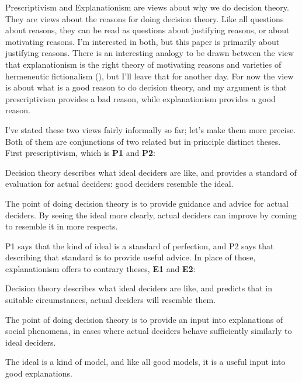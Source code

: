 \documentclass[
  11pt,
  letterpaper,
  DIV=11,
  numbers=noendperiod,
  twoside]{scrartcl}
\providecommand{\tightlist}{%
  \setlength{\itemsep}{0pt}\setlength{\parskip}{0pt}}\usepackage{longtable,booktabs,array}
\begin{document}
Prescriptivism and Explanationism are views about why we do decision
theory. They are views about the reasons for doing decision theory. Like
all questions about reasons, they can be read as questions about
justifying reasons, or about motivating reasons. I'm interested in both,
but this paper is primarily about justifying reasons. There is an
interesting analogy to be drawn between the view that explanationism is
the right theory of motivating reasons and varieties of hermeneutic
fictionalism (),
but I'll leave that for another day. For now the view is about what is a
good reason to do decision theory, and my argument is that
prescriptivism provides a bad reason, while explanationism provides a
good reason.

I've stated these two views fairly informally so far; let's make them
more precise. Both of them are conjunctions of two related but in
principle distinct theses. First prescriptivism, which is \textbf{P1}
and \textbf{P2}:

\begin{description}
\tightlist
\item[P1]
Decision theory describes what ideal deciders are like, and provides a
standard of evaluation for actual deciders: good deciders resemble the
ideal.
\item[P2]
The point of doing decision theory is to provide guidance and advice for
actual deciders. By seeing the ideal more clearly, actual deciders can
improve by coming to resemble it in more respects.
\end{description}

P1 says that the kind of ideal is a standard of perfection, and P2 says
that describing that standard is to provide useful advice. In place of
those, explanationism offers to contrary theses, \textbf{E1} and
\textbf{E2}:

\begin{description}
\tightlist
\item[E1]
Decision theory describes what ideal deciders are like, and predicts
that in suitable circumstances, actual deciders will resemble them.
\item[E2]
The point of doing decision theory is to provide an input into
explanations of social phenomena, in cases where actual deciders behave
sufficiently similarly to ideal deciders.
\end{description}

The ideal is a kind of model, and like all good models, it is a useful
input into good explanations.
\end{document}

